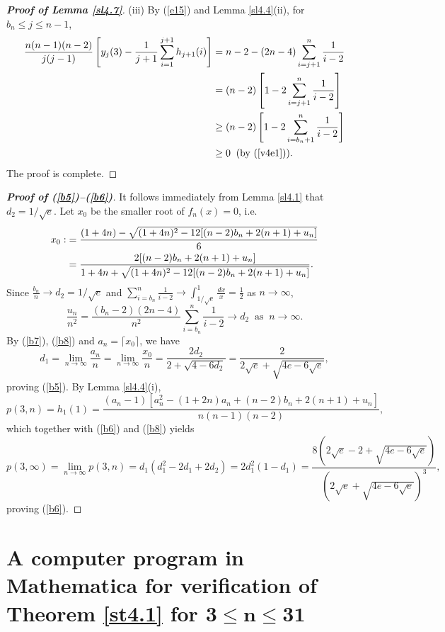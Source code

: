 \documentclass[12pt, A4paper, oneside]{article}
\theoremstyle{plain}
\numberwithin{equation}{section}
\begin{document}
\begin{proof}[\bf Proof of Lemma \ref{sl4.7}]
(iii) By (\ref{e15}) and Lemma \ref{sl4.4}(ii), for $b_n\le j\le n-1$,
\begin{align*}
\frac{n(n-1)(n-2)}{j(j-1)}\left[y_j(3)-\frac{1}{j+1}\sum_{i=1}^{j+1}h_{j+1}(i)\right]&=n-2-(2n-4)\sum_{i=j+1}^{n}\frac{1}{i-2}\\
&=(n-2)\left[1-2\sum_{i=j+1}^{n}\frac{1}{i-2}\right]\\
&\ge(n-2)\left[1-2\sum_{i=b_n+1}^{n}\frac{1}{i-2}\right]\\
&\ge0\;\;\mbox{(by (\ref{v4e1}))}.
\end{align*}
The proof is complete.
\end{proof}

\begin{proof}[\bf Proof of (\ref{b5})--(\ref{b6})]
It follows immediately from Lemma \ref{sl4.1} that $d_2=1/\sqrt{e}$. Let $x_0$ be the smaller root of $f_n(x)=0$, i.e.
\begin{align}
x_0:&=\frac{(1+4n)-\sqrt{(1+4n)^{2}-12[(n-2)b_n+2(n+1)+u_n]}}{6}\notag\\
&=\frac{2[(n-2)b_n+2(n+1)+u_n]}{1+4n+\sqrt{(1+4n)^{2}-12[(n-2)b_n+2(n+1)+u_n]}}.\label{b7}
\end{align}
Since $\frac{b_n}{n}\to d_2=1/\sqrt{e}$ and $\sum_{i=b_n}^{n}\frac{1}{i-2}\to\int_{1/\sqrt{e}}^{1}\frac{dx}{x}=\frac{1}{2}$ as $n\to\infty$,
\begin{equation}\label{b8}
\frac{u_n}{n^{2}}=\frac{(b_n-2)(2n-4)}{n^{2}}\sum_{i=b_n}^{n}\frac{1}{i-2}\to d_2\;\;\mbox{as}\;\;n\to\infty.
\end{equation}
By (\ref{b7}), (\ref{b8}) and $a_n=\lceil x_0\rceil$, we have
\begin{equation*}
d_1=\lim_{n\to\infty}\frac{a_n}{n}=\lim_{n\to\infty}\frac{x_0}{n}=\frac{2d_2}{2+\sqrt{4-6d_2}}=\frac{2}{2\sqrt{e}+\sqrt{4e-6\sqrt{e}}},
\end{equation*}
proving (\ref{b5}). By Lemma \ref{sl4.4}(i),
$$
p(3,n)=h_1(1)=\frac{(a_n-1)[a^{2}_{n}-(1+2n)a_{n}+(n-2)b_n+2(n+1)+u_n]}{n(n-1)(n-2)},
$$
which together with (\ref{b6}) and (\ref{b8}) yields
\begin{equation*}
p(3,\infty)=\lim_{n\to\infty}p(3,n)=d_1(d^{2}_{1}-2d_{1}+2d_{2})=2d^{2}_{1}(1-d_{1})=\frac{8\left(2\sqrt{e}-2+\sqrt{4e-6\sqrt{e}}\right)}{\left(2\sqrt{e}+\sqrt{4e-6\sqrt{e}}\right)^{3}},
\end{equation*}
proving (\ref{b6}).
\end{proof}


\section{A computer program in Mathematica for verification of Theorem \ref{st4.1} for $\mathbf{3\le n\le 31}$}
\end{document}
